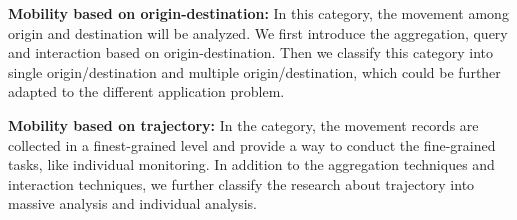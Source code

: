 \textbf{Mobility based on origin-destination:} In this category, the movement among origin and destination will be analyzed. We first introduce the aggregation, query and interaction based on origin-destination. Then we classify this category into single origin/destination and multiple origin/destination, which could be further adapted to the different application problem.

\textbf{Mobility based on trajectory:} In the category, the movement records are collected in a finest-grained level and provide a way to conduct the fine-grained tasks, like individual monitoring. In addition to the aggregation techniques and interaction techniques, we further classify the research about trajectory into massive analysis and individual analysis.




